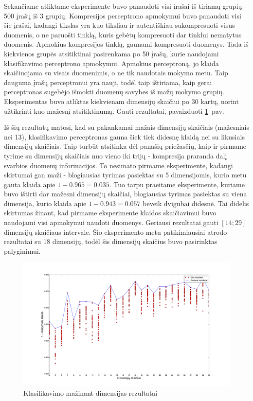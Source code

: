 \documentclass{VUMIFPSbakalaurinis}
\begin{document}
Sekančiame atliktame eksperimente buvo panaudoti visi įrašai iš tiriamų grupių - 500 įrašų iš 3 grupių.
Kompresijos perceptrono apmokymui buvo panaudoti visi šie įrašai, kadangi tikslas yra kuo tiksliau ir autentiškiau sukompresuoti visus duomenis, o ne paruošti tinklą, kuris gebėtų kompresuoti dar tinklui nematytus duomenis.
Apmokius kompresijos tinklą, gaunami kompresuoti duomenys.
Tada iš kiekvienos grupės atsitiktinai pasirenkama po 50 įrašų, kurie naudojami klasifikavimo perceptrono apmokymui.
Apmokius perceptroną, jo klaida skaičiuojama su visais duomenimis, o ne tik naudotais mokymo metu.
Taip dauguma įrašų perceptronui yra nauji, todėl taip ištiriama, kaip gerai perceptronas sugebėjo išmokti duomenų savybes iš mažų mokymo grupių.
Eksperimentas buvo atliktas kiekvienam dimensijų skaičiui po 30 kartų, norint užtikrinti kuo mažesnį atsitiktinumą.
Gauti rezultatai, pavaizduoti \ref{fig:experiment-2}~pav.

Iš šių rezultatų matosi, kad su pakankamai mažais dimensijų skaičiais (mažesniais nei 13), klasifikavimo perceptronas gauna šiek tiek didesnę klaidą nei su likusiais dimensijų skaičiais.
Taip turbūt atsitinka dėl panašių priežasčių, kaip ir pirmame tyrime su dimensijų skaičiais nuo vieno iki trijų - kompresija praranda dalį svarbios duomenų informacijos.
To nesimato pirmame eksperimente, kadangi skirtumai gan maži - blogiausias tyrimas pasiektas su 5 dimensijomis, kurio metu gauta klaida apie $1 - 0.965 = 0.035$.
Tuo tarpu praeitame eksperimente, kuriame buvo ištirti dar mažesni dimensijų skaičiai, blogiausias tyrimas pasiektas su viena dimensija, kurio klaida apie $1 - 0.943 = 0.057$ beveik dvigubai didesnė.
Tai didelis skirtumas žinant, kad pirmame eksperimente klaidos skaičiavimui buvo naudojami visi apmokymui naudoti duomenys.
Geriausi rezultatai gauti $[14; 29]$ dimensijų skaičiaus intervale.
Šio eksperimento metu patikimiausiai atrodo rezultatai su 18 dimensijų, todėl šis dimensijų skaičius buvo pasirinktas palyginimui.

\begin{figure}
	\includegraphics[scale=0.32]{pics/dimensions_2015-5-27_6-18-5}
	\caption{Klasifikavimo mažinant dimensijas rezultatai}
	\label{fig:experiment-2}
\end{figure}
\end{document}
